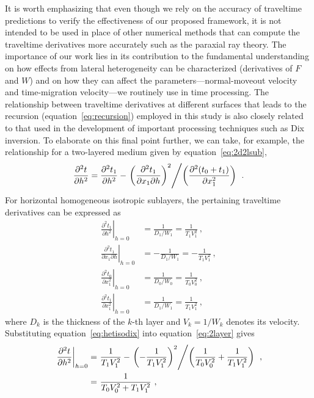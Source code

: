 It is worth emphasizing that even though we rely on the accuracy of traveltime predictions to verify the effectiveness of our proposed framework, it is not intended to be used in place of other numerical methods that can compute the traveltime derivatives more accurately such as the paraxial ray theory. The importance of our work lies in its contribution to the fundamental understanding on how effects from lateral heterogeneity can be characterized (derivatives of $F$ and $W$) and on how they can affect the parameters---normal-moveout velocity and time-migration velocity---we routinely use in time processing. The relationship between traveltime derivatives at different surfaces that leads to the recursion (equation~\ref{eq:recursion}) employed in this study is also closely related to that used in the development of important processing techniques such as Dix inversion. To elaborate on this final point further, we can take, for example, the relationship for a two-layered medium given by equation~\ref{eq:2d2lsub},
\begin{equation}
\label{eq:2layer}
\frac{\partial^2 t}{\partial h^2} = \frac{\partial^2 t_1}{\partial h^2} - \left. \left(\frac{\partial^2 t_1 }{ \partial x_1 \partial h}\right)^2 \middle/ \left(\frac{\partial^2 (t_0+t_1) }{ \partial x_1^2} \right) \right. ~.
\end{equation}
For horizontal homogeneous isotropic sublayers, the pertaining traveltime derivatives can be expressed as 
\begin{align}
\label{eq:hetisodix}
\left. \frac{\partial^2 t_1 }{\partial h^2} \right\rvert_{h=0} & = \frac{1}{D_1/W_1} = \frac{1}{T_1V^2_1}~,\\
\nonumber
\left. \frac{\partial^2 t_1 }{ \partial x_1 \partial h} \right\rvert_{h=0} & =  -\frac{1}{D_1/W_1} = -\frac{1}{T_1V^2_1} ~,\\
\nonumber
\left. \frac{\partial^2 t_0 }{ \partial x_1^2} \right\rvert_{h=0} & =  \frac{1}{D_0/W_0} = \frac{1}{T_0V^2_0}  ~,\\
\nonumber
\left. \frac{\partial^2 t_1 }{ \partial x_1^2} \right\rvert_{h=0} & =  \frac{1}{D_1/W_1} = \frac{1}{T_1V^2_1} ~,
\end{align}
where $D_k$ is the thickness of the $k$-th layer and $V_k=1/W_k$ denotes its velocity. Substituting equation~\ref{eq:hetisodix} into equation~\ref{eq:2layer} gives 
\begin{align}
\nonumber
    \left.\frac{\partial^2 t}{\partial h^2}\right\rvert_{h=0} = &~ \frac{1}{T_1V^2_1} - \left. \left(-\frac{1}{T_1V^2_1}\right)^2 \middle/ \left(\frac{1}{T_0V^2_0} + \frac{1}{T_1V^2_1} \right) \right.~, \\
    = &~ \frac{1}{T_0V^2_0 + T_1V^2_1}~,
\end{align}
